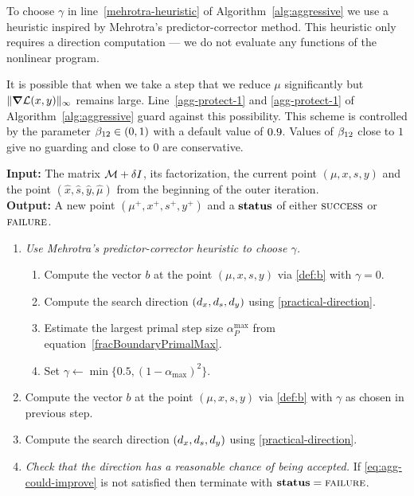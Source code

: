 \documentclass{article}
\begin{document}
To choose $\gamma$ in line~\ref{mehrotra-heuristic} of Algorithm~\ref{alg:aggressive} we use a heuristic inspired by Mehrotra's predictor-corrector method. This heuristic only requires a direction computation --- we do not evaluate any functions of the nonlinear program.

It is possible that when we take a step that we reduce $\mu$ significantly but $\| \grad \mathcal{L}(x,y) \|_{\infty}$ remains large. Line~\ref{agg-protect-1} and \ref{agg-protect-1} of Algorithm~\ref{alg:aggressive} guard against this possibility. This scheme is controlled by the parameter $\beta_{12} \in (0,1)$ with a default value of $0.9$. Values of $\beta_{12}$ close to $1$ give no guarding and close to $0$ are conservative.


\begin{algorithm}[H]
\textbf{Input:} The matrix $\mathcal{M} + \delta I$, its factorization, the current point $(\mu, x, s, y)$ and the point $(\hat{x}, \hat{s},  \hat{y}, \hat{\mu})$ from the beginning of the outer iteration.  \\
\textbf{Output:} A new point $(\mu^{+}, x^{+}, s^{+}, y^{+})$ and a $\textbf{status}$ of either $\textsc{success}$ or $\textsc{failure}$.
\begin{enumerate}[label*=A.{\arabic*}]
\item \label{mehrotra-heuristic} \emph{Use Mehrotra's predictor-corrector heuristic to choose $\gamma$.} 
\begin{enumerate}[label*=.{\arabic*}]
\item Compute the vector $b$ at the point $(\mu, x, s, y)$ via \eqref{def:b} with $\gamma = 0$.
\item Compute the search direction $(d_{x}, d_{s}, d_{y})$ using \eqref{practical-direction}.
\item Estimate the largest primal step size $\alpha^{\max}_{P}$ from equation~\eqref{fracBoundaryPrimalMax}.
\item Set $\gamma \gets \min\{0.5, (1 - \alpha_{\max})^2 \}$.
\end{enumerate}
\item Compute the vector $b$ at the point $(\mu, x, s, y)$ via \eqref{def:b} with $\gamma$ as chosen in previous step.
\item Compute the search direction $(d_{x}, d_{s}, d_{y})$ using \eqref{practical-direction}.
\item \emph{Check that the direction has a reasonable chance of being accepted.} If \eqref{eq:agg-could-improve} is not satisfied then terminate with $\textbf{status} = \textsc{failure}$.

\end{enumerate}
\end{algorithm}
\end{document}

